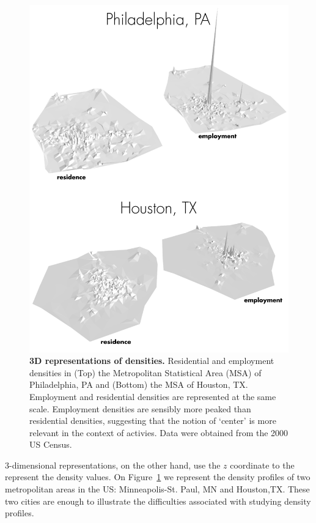 \begin{figure}
    \centering
    \includegraphics[width=\textwidth]{gfx/chapter-monocentric/panel_3d.png}
    \caption{{\bf 3D representations of densities.} Residential and
        employment densities in (Top) the Metropolitan Statistical Area (MSA) of
        Philadelphia, PA and (Bottom) the MSA of Houston, TX. Employment and
        residential densities are represented at the same scale.  Employment
        densities are sensibly more peaked than residential densities,
        suggesting that the notion of `center' is more relevant in the context of
        activies. Data were obtained from the 2000 US Census.  \label{fig:density_3d}}
\end{figure}


3-dimensional representations, on the other hand, use the $z$ coordinate to the
represent the density values. On Figure~\ref{fig:density_3d} we represent the
density profiles of two metropolitan areas in the US: Minneapolis-St.  Paul, MN
and Houston,TX. These two cities are enough to illustrate the difficulties
associated with studying density profiles.

